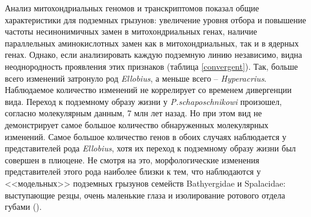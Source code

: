 Анализ митохондриальных геномов и транскриптомов показал общие характеристики для подземных грызунов: увеличение уровня отбора и повышение частоты несинонимичных замен в митохондриальных генах, наличие параллельных аминокислотных замен как в митохондриальных, так и в ядерных генах. Однако, если анализировать каждую подземную линию независимо, видна неоднородность проявления этих признаков (таблица \ref{convergent}). Так, больше всего изменений затронуло род \textit{Ellobius}, а меньше всего -- \textit{Hyperacrius}. Наблюдаемое количество изменений не коррелирует со временем дивергенции вида. Переход к подземному образу жизни у \textit{P.schaposchnikowi} произошел, согласно молекулярным данным, 7 млн лет назад. Но при этом вид не демонстрирует самое большое количество обнаруженных молекулярных изменений. Самое большое количество генов в обоих случаях наблюдается у представителей рода \textit{Ellobius}, хотя их переход к подземному образу жизни был совершен в плиоцене. Не смотря на это, морфологические изменения представителей этого рода наиболее близки к тем, что наблюдаются у <<модельных>> подземных грызунов семейств Bathyergidae и Spalacidae: выступающие резцы, очень маленькие глаза и изолирование ротового отдела губами (\cite{Gromov1977}). 

